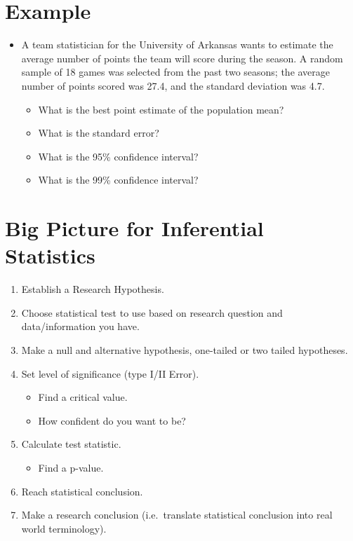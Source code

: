 \documentclass[12pt]{article}
\begin{document}
\section{Example}\label{example-1}

\begin{itemize}
\itemsep1pt\parskip0pt
\item
  A team statistician for the University of Arkansas wants to estimate
  the average number of points the team will score during the season. A
  random sample of 18 games was selected from the past two seasons; the
  average number of points scored was 27.4, and the standard deviation
  was 4.7.

  \begin{itemize}
  \itemsep1pt\parskip0pt
  \item
    What is the best point estimate of the population mean?\\
  \item
    What is the standard error?
  \item
    What is the 95\% confidence interval?
  \item
    What is the 99\% confidence interval?
  \end{itemize}
\end{itemize}

\section{Big Picture for Inferential
Statistics}\label{big-picture-for-inferential-statistics}

\begin{enumerate}
\def\labelenumi{\arabic{enumi}.}
\itemsep1pt\parskip0pt
\item
  Establish a Research Hypothesis.
\item
  Choose statistical test to use based on research question and
  data/information you have.
\item
  Make a null and alternative hypothesis, one-tailed or two tailed
  hypotheses.
\item
  Set level of significance (type I/II Error).

  \begin{itemize}
  \itemsep1pt\parskip0pt
  \item
    Find a critical value.
  \item
    How confident do you want to be?
  \end{itemize}
\item
  Calculate test statistic.

  \begin{itemize}
  \itemsep1pt\parskip0pt
  \item
    Find a p-value.
  \end{itemize}
\item
  Reach statistical conclusion.
\item
  Make a research conclusion (i.e.~translate statistical conclusion into
  real world terminology).
\end{enumerate}
\end{document}
